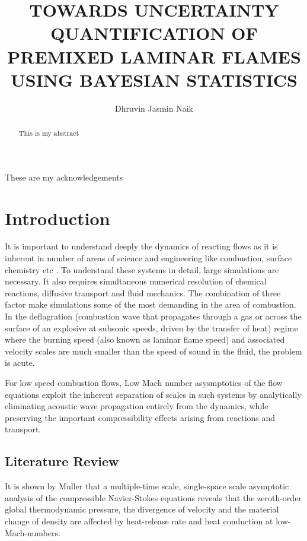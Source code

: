 \documentclass[10pt]{ubthesis}
\title{TOWARDS UNCERTAINTY QUANTIFICATION OF PREMIXED LAMINAR FLAMES USING BAYESIAN STATISTICS}
\author{Dhruvin Jasmin Naik}
\begin{document}
\begin{titlepage}
\maketitle
\end{titlepage}

\begin{ubfrontmatter}
\makecopyright
\cleardoublepage
\begin{acknowledgements}
These are my acknowledgements
\end{acknowledgements}
\tableofcontents

\cleardoublepage
\listoffigures
\cleardoublepage
\listoftables
\cleardoublepage
\begin{abstract}
This is my abstract
\end{abstract}
\end{ubfrontmatter}

\chapter{Introduction}

It is important to understand deeply the dynamics of reacting flows as it is inherent in number of areas of science and engineering like combustion, surface chemistry etc . To understand these systems in detail, large simulations are necessary. It also requires simultaneous numerical resolution of chemical reactions, diffusive
transport and fluid mechanics. The combination of three factor make simulations some of the most demanding in the area of combustion. In the deflagration (combustion wave that propagates through a gas or across the surface of an explosive at subsonic speeds, driven by the transfer of heat) regime where the burning speed (also known as laminar flame speed) and associated velocity scales are much smaller than the speed of sound in the fluid, the problem is acute.

\bigskip
\noindent For low speed combustion flows, Low Mach number asysmptotics of the flow equations exploit the inherent separation of scales in such systems by analytically eliminating acoustic wave propagation entirely from the dynamics, while preserving the important compressibility effects arising from reactions and transport.
\section{Literature Review}
It is shown by Muller \cite{Muller} that a multiple-time scale, single-space scale asymptotic analysis of the compressible Navier-Stokes equations reveals that the zeroth-order global thermodynamic pressure, the divergence of velocity and the material change of density are affected by heat-release rate and heat conduction at low-Mach-numbers.
\end{document}
